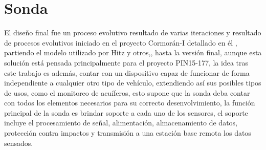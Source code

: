 \section{Sonda}
El dise\~no final fue un proceso evolutivo resultado de varias iteraciones y resultado de procesos evolutivos iniciado en el proyecto Cormor\'an-I detallado en \'el 
, partiendo el modelo utilizado por Hitz y otros,\cite{hitz2012design},
hasta la versi\'on final, aunque esta soluci\'on est\'a pensada principalmente para el proyecto PIN15-177, la idea tras este trabajo es adem\'as, contar con un dispositivo capaz de funcionar de forma independiente a cualquier otro tipo de veh\'iculo, extendiendo as\'i sus posibles tipos de usos, como el monitoreo de acu\'iferos, esto supone que la sonda deba contar con todos los elementos necesarios para su correcto desenvolvimiento, la funci\'on principal de la sonda es brindar soporte a cada uno de los sensores, el soporte incluye el procesamiento de se\~nal, alimentaci\'on, almacenamiento de datos, protecci\'on contra impactos y transmisi\'on a una estaci\'on base remota los datos sensados.
